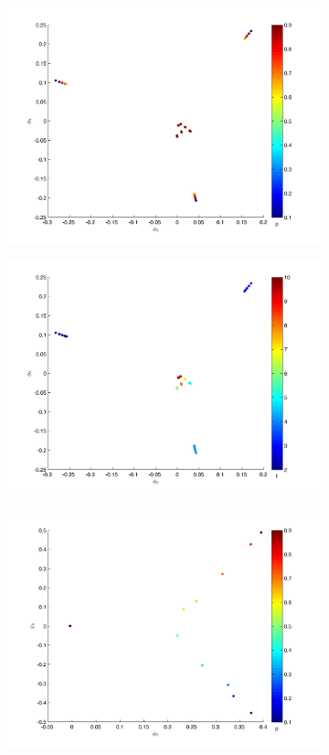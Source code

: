 \documentclass[12pt]{article}
\begin{document}
\begin{figure}[htb]
\begin{subfigure}{0.5\textwidth}
\includegraphics[width=\textwidth]{rawhist_p_1}
\caption{}
\end{subfigure}
\begin{subfigure}{0.5\textwidth}
\includegraphics[width=\textwidth]{rawhist_t_1}
\caption{}
\end{subfigure}
\begin{subfigure}{0.5\textwidth}
\includegraphics[width=\textwidth]{rawhist_p_400}

\end{subfigure}
\end{figure}
\end{document}
